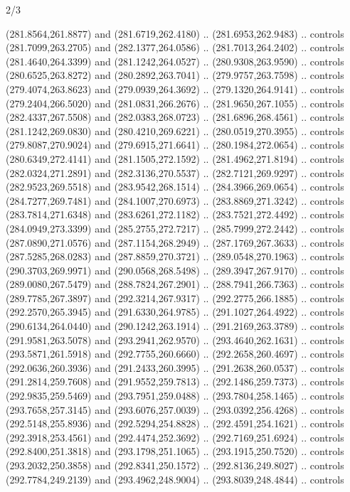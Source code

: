 \begin{flagdescription}{2/3}
\begin{scope}[xshift=0.5\flaglength,yshift=0.5\flagwidth,scale=\flagwidth/318.91]
\begin{scope}[y=0.8pt, x=0.8pt, yscale=-1,shift={(-298.97,-199.32)}]
  (281.8564,261.8877) and (281.6719,262.4180) .. (281.6953,262.9483) .. controls
  (281.7099,263.2705) and (282.1377,264.0586) .. (281.7013,264.2402) .. controls
  (281.4640,264.3399) and (281.1242,264.0527) .. (280.9308,263.9590) .. controls
  (280.6525,263.8272) and (280.2892,263.7041) .. (279.9757,263.7598) .. controls
  (279.4074,263.8623) and (279.0939,264.3692) .. (279.1320,264.9141) .. controls
  (279.2404,266.5020) and (281.0831,266.2676) .. (281.9650,267.1055) .. controls
  (282.4337,267.5508) and (282.0383,268.0723) .. (281.6896,268.4561) .. controls
  (281.1242,269.0830) and (280.4210,269.6221) .. (280.0519,270.3955) .. controls
  (279.8087,270.9024) and (279.6915,271.6641) .. (280.1984,272.0654) .. controls
  (280.6349,272.4141) and (281.1505,272.1592) .. (281.4962,271.8194) .. controls
  (282.0324,271.2891) and (282.3136,270.5537) .. (282.7121,269.9297) .. controls
  (282.9523,269.5518) and (283.9542,268.1514) .. (284.3966,269.0654) .. controls
  (284.7277,269.7481) and (284.1007,270.6973) .. (283.8869,271.3242) .. controls
  (283.7814,271.6348) and (283.6261,272.1182) .. (283.7521,272.4492) .. controls
  (284.0949,273.3399) and (285.2755,272.7217) .. (285.7999,272.2442) .. controls
  (287.0890,271.0576) and (287.1154,268.2949) .. (287.1769,267.3633) .. controls
  (287.5285,268.0283) and (287.8859,270.3721) .. (289.0548,270.1963) .. controls
  (290.3703,269.9971) and (290.0568,268.5498) .. (289.3947,267.9170) .. controls
  (289.0080,267.5479) and (288.7824,267.2901) .. (288.7941,266.7363) .. controls
  (289.7785,267.3897) and (292.3214,267.9317) .. (292.2775,266.1885) .. controls
  (292.2570,265.3945) and (291.6330,264.9785) .. (291.1027,264.4922) .. controls
  (290.6134,264.0440) and (290.1242,263.1914) .. (291.2169,263.3789) .. controls
  (291.9581,263.5078) and (293.2941,262.9570) .. (293.4640,262.1631) .. controls
  (293.5871,261.5918) and (292.7755,260.6660) .. (292.2658,260.4697) .. controls
  (292.0636,260.3936) and (291.2433,260.3995) .. (291.2638,260.0537) .. controls
  (291.2814,259.7608) and (291.9552,259.7813) .. (292.1486,259.7373) .. controls
  (292.9835,259.5469) and (293.7951,259.0488) .. (293.7804,258.1465) .. controls
  (293.7658,257.3145) and (293.6076,257.0039) .. (293.0392,256.4268) .. controls
  (292.5148,255.8936) and (292.5294,254.8828) .. (292.4591,254.1621) .. controls
  (292.3918,253.4561) and (292.4474,252.3692) .. (292.7169,251.6924) .. controls
  (292.8400,251.3818) and (293.1798,251.1065) .. (293.1915,250.7520) .. controls
  (293.2032,250.3858) and (292.8341,250.1572) .. (292.8136,249.8027) .. controls
  (292.7784,249.2139) and (293.4962,248.9004) .. (293.8039,248.4844) .. controls

\end{scope}
\end{scope}
\end{flagdescription}
